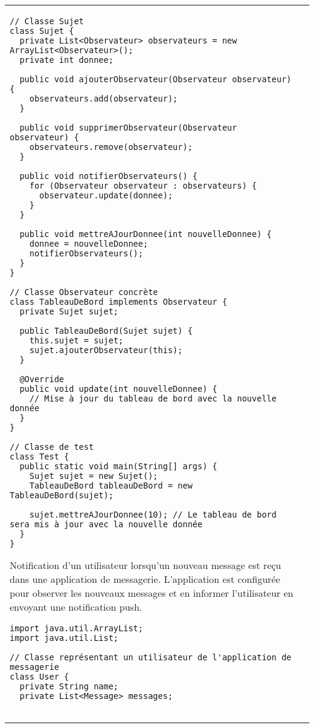 \begin{table}[H]
\begin{adjustbox}{max width=\textwidth}
\begin{tabular}{l|p{\textwidth}}
\begin{minipage}[tl]{0.5\textwidth}
\begin{minipage}[b]{1\textwidth}
\begin{lstlisting}[style=monstyle]
// Classe Sujet
class Sujet {
  private List<Observateur> observateurs = new ArrayList<Observateur>();
  private int donnee;

  public void ajouterObservateur(Observateur observateur) {
    observateurs.add(observateur);
  }

  public void supprimerObservateur(Observateur observateur) {
    observateurs.remove(observateur);
  }

  public void notifierObservateurs() {
    for (Observateur observateur : observateurs) {
      observateur.update(donnee);
    }
  }

  public void mettreAJourDonnee(int nouvelleDonnee) {
    donnee = nouvelleDonnee;
    notifierObservateurs();
  }
}

// Classe Observateur concrète
class TableauDeBord implements Observateur {
  private Sujet sujet;

  public TableauDeBord(Sujet sujet) {
    this.sujet = sujet;
    sujet.ajouterObservateur(this);
  }

  @Override
  public void update(int nouvelleDonnee) {
    // Mise à jour du tableau de bord avec la nouvelle donnée
  }
}

// Classe de test
class Test {
  public static void main(String[] args) {
    Sujet sujet = new Sujet();
    TableauDeBord tableauDeBord = new TableauDeBord(sujet);

    sujet.mettreAJourDonnee(10); // Le tableau de bord sera mis à jour avec la nouvelle donnée
  }
}

\end{lstlisting} 
\end{minipage}
\end{minipage}
\hspace{6mm}
\begin{minipage}[tr]{0.5\textwidth}
\begin{minipage}[t]{1\textwidth}
Notification d'un utilisateur lorsqu'un nouveau message est reçu dans une application de messagerie. L'application est configurée pour observer les nouveaux messages et en informer l'utilisateur en envoyant une notification push.  
\end{minipage}
\begin{minipage}[b]{1\textwidth}
\begin{lstlisting}[style=monstyle]
import java.util.ArrayList;
import java.util.List;

// Classe représentant un utilisateur de l'application de messagerie
class User {
  private String name;
  private List<Message> messages;


\end{lstlisting}
\end{minipage}
\end{minipage}
\end{tabular}
\end{adjustbox}
\end{table}
